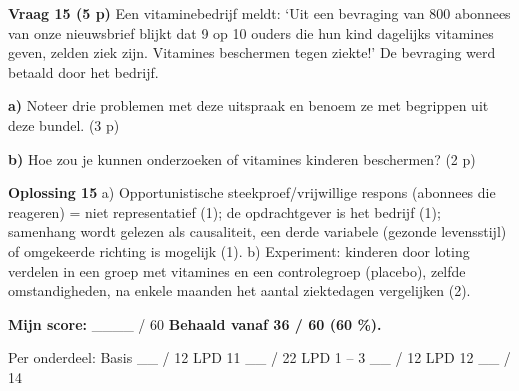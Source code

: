 \textbf{Vraag 15 \quad (5 p)} Een vitaminebedrijf meldt: ‘Uit een bevraging van 800 abonnees van onze nieuwsbrief blijkt dat 9 op 10 ouders die hun kind dagelijks vitamines geven, zelden ziek zijn. Vitamines beschermen tegen ziekte!’ De bevraging werd betaald door het bedrijf.

\textbf{a)} Noteer drie problemen met deze uitspraak en benoem ze met begrippen uit deze bundel. (3 p) \lijn

\textbf{b)} Hoe zou je kunnen onderzoeken of vitamines kinderen beschermen? (2 p) \lijn

\begin{oplossing}
\textbf{Oplossing 15} \quad a) Opportunistische steekproef/vrijwillige respons (abonnees die reageren) = niet representatief (1); de opdrachtgever is het bedrijf (1); samenhang wordt gelezen als causaliteit, een derde variabele (gezonde levensstijl) of omgekeerde richting is mogelijk (1). b) Experiment: kinderen door loting verdelen in een groep met vitamines en een controlegroep (placebo), zelfde omstandigheden, na enkele maanden het aantal ziektedagen vergelijken (2).
\end{oplossing}

\begin{doel}
\textbf{Mijn score:} \_\_\_\_ / 60 \quad \textbf{Behaald vanaf 36 / 60 (60 \%).}

Per onderdeel: Basis \_\_ / 12 \quad LPD 11 \_\_ / 22 \quad LPD 1 – 3 \_\_ / 12 \quad LPD 12 \_\_ / 14
\end{doel}
